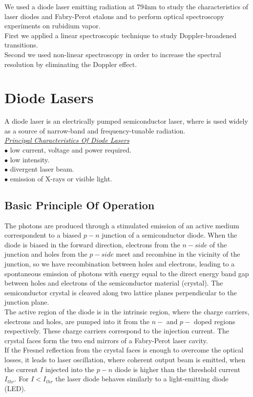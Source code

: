 \documentclass[openany,11pt,a4paper]{book}
\begin{document}
We used a diode laser emitting radiation at 794nm to study the characteristics of laser diodes and Fabry-Perot etalons and to perform optical spectroscopy experiments on rubidium vapor.\\

First we applied a linear spectroscopic technique to study Doppler-broadened transitions. \\
Second we used non-linear spectroscopy in order to increase the spectral resolution by eliminating the Doppler effect.\\


 




\chapter{Diode Lasers}

A diode laser is an electrically pumped semiconductor laser, where is used widely as a source of narrow-band and frequency-tunable radiation.\\ 


\underline {\emph{Principal Characteristics Of Diode Lasers}}\\
$ \bullet $ low current, voltage and power required.\\
$ \bullet $ low intensity.\\
$ \bullet $ divergent laser beam.\\
$ \bullet $ emission of X-rays or visible light.\\

 

\section{Basic Principle Of Operation} 
The photons are produced through a stimulated emission of an active medium correspondent to a biased $p-n$ junction of a semiconductor diode. When the diode is biased in the forward direction, electrons from the $n-side$ of the junction and holes from the $ p-side$ meet and recombine in the vicinity of the junction, so we have recombination between holes and electrons, leading to a spontaneous emission of photons with energy equal to the direct energy band gap between holes and electrons of the semiconductor material (crystal). The semiconductor crystal is cleaved along two lattice planes perpendicular to the junction plane.\\
The active region of the diode is in the intrinsic region, where the charge carriers, electrons and holes, are pumped into it from the $n-$ and $p-$ doped regions respectively. These charge carriers correspond to the injection current. The crystal faces form the two end mirrors of a Fabry-Perot laser cavity.\\
If the Fresnel reflection from the crystal faces is enough to overcome the optical losses, it leads to laser oscillation, where coherent output beam is emitted, when the current $I$ injected into the $p-n$ diode is higher than the threshold current $I_{thr}$. For $I < I_{thr} $ the laser diode behaves similarly to a light-emitting diode (LED).\\
\end{document}
